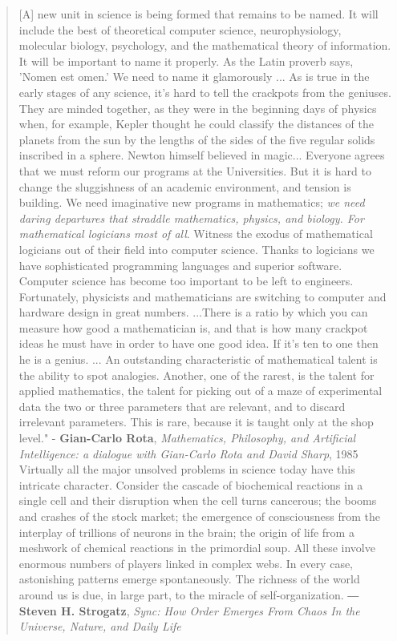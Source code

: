 \documentclass{article}
\begin{document}
\begin{quotation}
    [A] new unit in science is being formed that remains to be named. It will include the best of theoretical computer science, neurophysiology, molecular biology, psychology, and the mathematical theory of information. It will be important to name it properly. As the Latin proverb says, 'Nomen est omen.' We need to name it glamorously ... As is true in the early stages of any science, it's hard to tell the crackpots from the geniuses. They are minded together, as they were in the beginning days of physics when, for example, Kepler thought he could classify the distances of the planets from the sun by the lengths of the sides of the five regular solids inscribed in a sphere. Newton himself believed in magic... Everyone agrees that we must reform our programs at the Universities. But it is hard to change the sluggishness of an academic environment, and tension is building. We need imaginative new programs in mathematics;  \textit{we need daring departures that straddle mathematics, physics, and biology. For mathematical logicians most of all}. Witness the exodus of mathematical logicians out of their field into computer science. Thanks to logicians we have sophisticated programming languages and superior software. Computer science has become too important to be left to engineers. Fortunately, physicists and mathematicians are switching to computer and hardware design in great numbers. ...There is a ratio by which you can measure how good a mathematician is, and that is how many crackpot ideas he must have in order to have one good idea. If it's ten to one then he is a genius. ... An outstanding characteristic of mathematical talent is the ability to spot analogies. Another, one of the rarest, is the talent for applied mathematics, the talent for picking out of a maze of experimental data the two or three parameters that are relevant, and to discard irrelevant parameters. This is rare, because it is taught only at the shop level."
    \newline
    - \textbf{Gian-Carlo Rota},
    \textit{Mathematics, Philosophy, and Artificial Intelligence: a dialogue with Gian-Carlo Rota and David Sharp}, 1985\cite{Rota1985}
    \newline
    \newline
    Virtually all the major unsolved problems in science today have this intricate character. Consider the cascade of biochemical reactions in a single cell and their disruption when the cell turns cancerous; the booms and crashes of the stock market; the emergence of consciousness from the interplay of trillions of neurons in the brain; the origin of life from a meshwork of chemical reactions in the primordial soup. All these involve enormous numbers of players linked in complex webs. In every case, astonishing patterns emerge spontaneously. The richness of the world around us is due, in large part, to the miracle of self-organization.
    \newline
    ― \textbf{Steven H. Strogatz}, \textit{Sync: How Order Emerges From Chaos In the Universe, Nature, and Daily Life}\cite{Strogatz2003}
\end{quotation}
\end{document}
